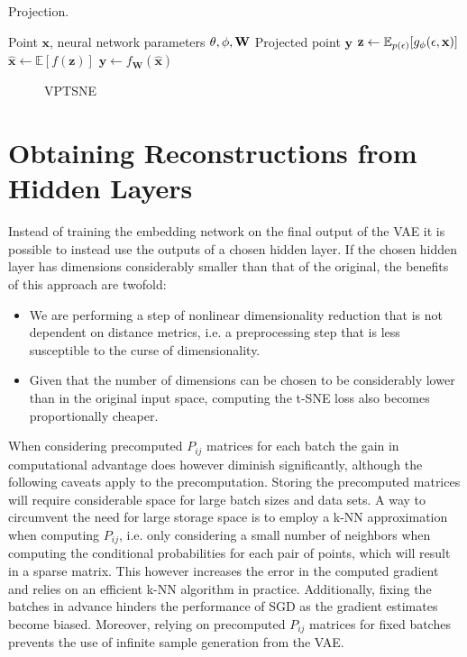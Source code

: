 \begin{algorithm}[H]
  \caption{Projection.}
  \label{alg:projection}
  \begin{algorithmic}[1]
    \Require Point $\mathbf{x}$, neural network parameters $\mathbf{\theta}, \mathbf{\phi}, \mathbf{W}$
    \Ensure Projected point $\mathbf{y}$
    \State $\mathbf{z} \gets \mathbb{E}_{p(\mathbf{\epsilon})}[g_{\mathbf{\phi}}(\mathbf{\epsilon}, \mathbf{x})]$
    \State $\hat{\mathbf{x}} \gets \mathbb{E}[f(\mathbf{z})]$
    \State $\mathbf{y} \gets f_{\mathbf{W}}(\hat{\mathbf{x}})$
  \end{algorithmic}
\end{algorithm}

\begin{figure}[!htb]
  \centering
  \resizebox{\textwidth}{!}{\unskip}
  \caption{VPTSNE}
  \label{fig:vptsne}
\end{figure}

\section{Obtaining Reconstructions from Hidden Layers}
\label{section:sampling_from_hidden_layers}

Instead of training the embedding network on the final output of the VAE it is possible to instead use the outputs of a chosen hidden layer. If the chosen hidden layer has dimensions considerably smaller than that of the original, the benefits of this approach are twofold:

\begin{itemize}
\item We are performing a step of nonlinear dimensionality reduction that is not dependent on distance metrics, i.e. a preprocessing step that is less susceptible to the curse of dimensionality.
\item Given that the number of dimensions can be chosen to be considerably lower than in the original input space, computing the t-SNE loss also becomes proportionally cheaper.
\end{itemize}

When considering precomputed $P_{ij}$ matrices for each batch the gain in computational advantage does however diminish significantly, although the following caveats apply to the precomputation. Storing the precomputed matrices will require considerable space for large batch sizes and data sets. A way to circumvent the need for large storage space is to employ a k-NN approximation when computing $P_{ij}$, i.e. only considering a small number of neighbors when computing the conditional probabilities for each pair of points, which will result in a sparse matrix. This however increases the error in the computed gradient and relies on an efficient k-NN algorithm in practice. Additionally, fixing the batches in advance hinders the performance of SGD as the gradient estimates become biased. Moreover, relying on precomputed $P_{ij}$ matrices for fixed batches prevents the use of infinite sample generation from the VAE.

